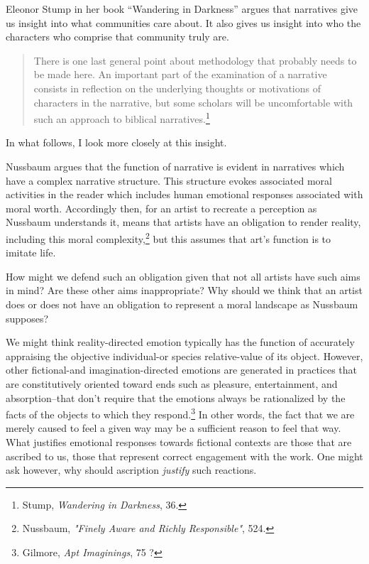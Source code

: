 \documentclass[phdthesis,12pt,final,a4paper]{wuthesis}
\theoremstyle{definition}
\theoremstyle{definition}
\theoremstyle{definition}
\theoremstyle{definition}
\theoremstyle{remark}
\begin{document}
Eleonor Stump in her book ``Wandering in Darkness'' argues that narratives give us insight into what communities care about. It also gives us insight into who the characters who comprise that community truly are.

\begin{quote}
There is one last general point about methodology that probably needs to be made here. An important part of the examination of a narrative consists in reflection on the underlying thoughts or motivations of characters in the narrative, but some scholars will be uncomfortable with such an approach to biblical narratives.\footnote{Stump, \emph{Wandering in {Darkness}}, 36.}
\end{quote}

\noindent In what follows, I look more closely at this insight.

Nussbaum argues that the function of narrative is evident in narratives which have a complex narrative structure. This structure evokes associated moral activities in the reader which includes human emotional responses associated with moral worth. Accordingly then, for an artist to recreate a perception as Nussbaum understands it, means that artists have an obligation to render reality, including this moral complexity,\footnote{Nussbaum, \emph{"{Finely Aware} and {Richly Responsible}"}, 524.} but this assumes that art's function is to imitate life.

How might we defend such an obligation given that not all artists have such aims in mind? Are these other aims inappropriate? Why should we think that an artist does or does not have an obligation to represent a moral landscape as Nussbaum supposes?

We might think reality-directed emotion typically has the function of accurately appraising the objective individual-or species relative-value of its object. However, other fictional-and imagination-directed emotions are generated in practices that are constitutively oriented toward ends such as pleasure, entertainment, and absorption--that don't require that the emotions always be rationalized by the facts of the objects to which they respond.\footnote{Gilmore, \emph{Apt {Imaginings}}, 75 ?} In other words, the fact that we are merely caused to feel a given way may be a sufficient reason to feel that way. What justifies emotional responses towards fictional contexts are those that are ascribed to us, those that represent correct engagement with the work. One might ask however, why should ascription \emph{justify} such reactions.
\end{document}
